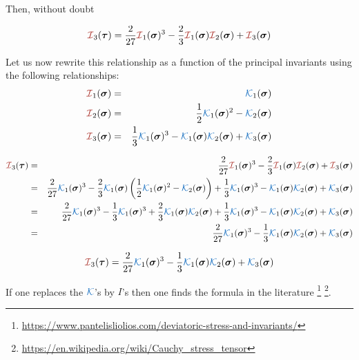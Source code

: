 Then, without doubt

\begin{mdframed}[backgroundcolor=blue!5]
\[
{\III}_3(\bm\tau) =
 \frac{2}{27}  {\III}_1(\bm\sigma)^3 - \frac23{\III}_1(\bm\sigma) {\III}_2(\bm\sigma)
+{\III}_3(\bm\sigma)
\]
\end{mdframed}

Let us now rewrite this relationship as a function of the principal invariants using the 
following relationships:
\begin{eqnarray}
{\III}_1({\bm \sigma})&=& {\KKK}_1({\bm \sigma}) \nn\\ 
{\III}_2({\bm \sigma})&=& \frac{1}{2}{\KKK}_1({\bm \sigma})^2-{\KKK}_2({\bm \sigma}) \nn\\
{\III}_3({\bm \sigma})&=& \frac{1}{3}{\KKK}_1({\bm \sigma})^3-{\KKK}_1({\bm \sigma}) \nn
{\KKK}_2({\bm \sigma}) +{\KKK}_3({\bm \sigma})
\end{eqnarray}

\begin{eqnarray}
{\III}_3(\bm\tau) 
&=& \frac{2}{27} {\III}_1(\bm\sigma)^3 
-\frac23 {\III}_1(\bm\sigma){\III}_2(\bm\sigma) + {\III}_3(\bm \sigma) \nn\\
&=& \frac{2}{27} {\KKK}_1(\bm\sigma)^3
-\frac23 {\KKK}_1(\bm\sigma)  \left( \frac{1}{2}{\KKK}_1({\bm \sigma})^2 -{\KKK}_2({\bm \sigma}) \right)
+ \frac{1}{3}{\KKK}_1({\bm \sigma})^3 -{\KKK}_1({\bm \sigma}) 
{\KKK}_2({\bm \sigma}) +{\KKK}_3({\bm \sigma}) \nn\\
&=& \frac{2}{27} {\KKK}_1(\bm\sigma)^3
-\frac13 {\KKK}_1(\bm\sigma)^3 
+\frac23 {\KKK}_1(\bm\sigma)  {\KKK}_2({\bm \sigma}) 
+ \frac{1}{3}{\KKK}_1({\bm \sigma})^3 -{\KKK}_1({\bm \sigma}) {\KKK}_2({\bm \sigma}) 
+{\KKK}_3({\bm \sigma}) \nn\\
&=& \frac{2}{27} {\KKK}_1(\bm\sigma)^3
-\frac13 {\KKK}_1(\bm\sigma)  {\KKK}_2({\bm \sigma}) 
+{\KKK}_3({\bm \sigma}) 
\end{eqnarray}

\begin{mdframed}[backgroundcolor=blue!5]
\begin{equation}
{\III}_3(\bm\tau) 
= 
\frac{2}{27} {\KKK}_1(\bm\sigma)^3 -\frac13 {\KKK}_1(\bm\sigma)  {\KKK}_2({\bm \sigma}) +{\KKK}_3({\bm \sigma}) 
\end{equation}
\end{mdframed}

If one replaces the ${\KKK}$'s by $I$'s then one finds the formula in the literature 
\footnote{\url{https://www.pantelisliolios.com/deviatoric-stress-and-invariants/}}
\footnote{\url{https://en.wikipedia.org/wiki/Cauchy_stress_tensor}}.


